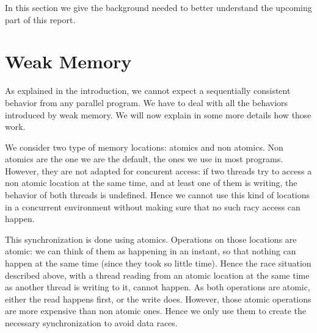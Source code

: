 In this section we give the background needed to better understand the upcoming part of this report. 

\section {Weak Memory}
As explained in the introduction, we cannot expect a sequentially consistent behavior from any parallel program. 
We have to deal with all the behaviors introduced by weak memory. We will now explain in some more details how those work.

We consider two type of memory locations: atomics and non atomics. Non atomics are the one we are the default, the ones we use in most programs. However, they are not adapted for concurent access: if two threads try to access a non atomic location at the same time, and at least one of them is writing, the behavior of both threads is undefined. Hence we cannot use this kind of locations in a concurrent environment without making sure that no such racy access can happen. 

This synchronization is done using atomics. Operations on those locations are atomic: we can think of them as happening in an instant, so that nothing can happen at the same time (since they took so little time). Hence the race situation described above, with a thread reading from an atomic location at the same time as another thread is writing to it, cannot happen. As both operations are atomic, either the read happens first, or the write does. However, those atomic operations are more expensive than non atomic ones. Hence we only use them to create the necessary synchronization to avoid data races.

